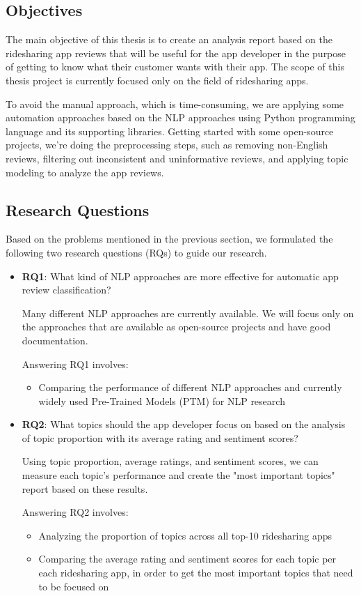 \documentclass[12pt]{article}
\begin{document}
\subsection{Objectives}
The main objective of this thesis is to create an analysis report based on the ridesharing app reviews that will be useful for the app developer in the purpose of getting to know what their customer wants with their app. The scope of this thesis project is currently focused only on the field of ridesharing apps.

To avoid the manual approach, which is time-consuming, we are applying some automation approaches based on the NLP approaches using Python programming language and its supporting libraries. Getting started with some open-source projects, we’re doing the preprocessing steps, such as removing non-English reviews, filtering out inconsistent and uninformative reviews, and applying topic modeling to analyze the app reviews.

\newpage
\subsection{Research Questions}
Based on the problems mentioned in the previous section, we formulated the following two research questions (RQs) to guide our research.
\begin{itemize}
\item \textbf{RQ1}: What kind of NLP approaches are more effective for automatic app review classification?

Many different NLP approaches are currently available. We will focus only on the approaches that are available as open-source projects and have good documentation.


Answering RQ1 involves: 
\begin{itemize}
\item Comparing the performance of different NLP approaches and currently widely used Pre-Trained Models (PTM) for NLP research
\end{itemize}

\item \textbf{RQ2}: What topics should the app developer focus on based on the analysis of topic proportion with its average rating and sentiment scores?

Using topic proportion, average ratings, and sentiment scores, we can measure each topic's performance and create the "most important topics" report based on these results.

Answering RQ2 involves:
\begin{itemize}
\item Analyzing the proportion of topics across all top-10 ridesharing apps
\item Comparing the average rating and sentiment scores for each topic per each ridesharing app, in order to get the most important topics that need to be focused on
\end{itemize}
\end{itemize}
\end{document}
